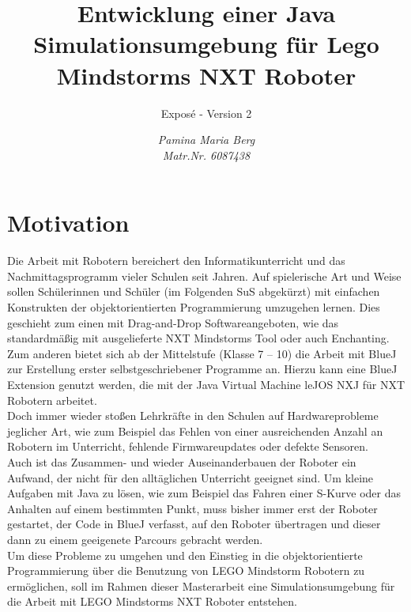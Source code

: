 \documentclass[paper=a4, pagesize, DIV=calc, BCOR=12.5mm, twoside=off, onecolumn=on, open = any, titlepage =on, parskip =half-, headsepline = on, footsepline = on, chapterprefix = on, appendixprefix = off, fontsize = 12pt, numbers = noenddot, abstract = on]{scrbook}
\numberwithin{equation}{chapter}
\begin{document}
\thispagestyle{plain}


\title{Entwicklung einer Java Simulationsumgebung für Lego Mindstorms NXT Roboter}
\subtitle{Exposé - Version 2}
\author{\emph{Pamina Maria Berg}\\
\emph{Matr.Nr. 6087438}}

\maketitle

\par \singlespacing
\section*{Motivation}
\onehalfspacing
Die Arbeit mit Robotern bereichert den Informatikunterricht und das Nachmittagsprogramm vieler Schulen seit Jahren. Auf spielerische Art und Weise sollen Schülerinnen und Schüler (im Folgenden SuS abgekürzt) mit einfachen Konstrukten der objektorientierten Programmierung umzugehen lernen. Dies geschieht zum einen mit Drag-and-Drop Softwareangeboten, wie das standardmäßig mit ausgelieferte NXT Mindstorms Tool oder auch Enchanting. Zum anderen bietet sich ab der Mittelstufe (Klasse 7 -- 10) die Arbeit mit BlueJ zur Erstellung erster selbstgeschriebener Programme an. Hierzu kann eine BlueJ Extension genutzt werden, die mit der Java Virtual Machine leJOS NXJ für NXT Robotern arbeitet.\\
Doch immer wieder stoßen Lehrkräfte in den Schulen auf Hardwareprobleme jeglicher Art, wie zum Beispiel das Fehlen von einer ausreichenden Anzahl an Robotern im Unterricht, fehlende Firmwareupdates oder defekte Sensoren.\\
Auch ist das Zusammen- und wieder Auseinanderbauen der Roboter ein Aufwand, der nicht für den alltäglichen Unterricht geeignet sind. Um kleine Aufgaben mit Java zu lösen, wie zum Beispiel das Fahren einer S-Kurve oder das Anhalten auf einem bestimmten Punkt, muss bisher immer erst der Roboter gestartet, der Code in BlueJ verfasst, auf den Roboter übertragen und dieser dann zu einem geeigenete Parcours gebracht werden.\\
Um diese Probleme zu umgehen und den Einstieg in die objektorientierte Programmierung über die Benutzung von LEGO Mindstorm Robotern zu ermöglichen, soll im Rahmen dieser Masterarbeit eine Simulationsumgebung für die Arbeit mit LEGO Mindstorms NXT Roboter entstehen.
\end{document}
